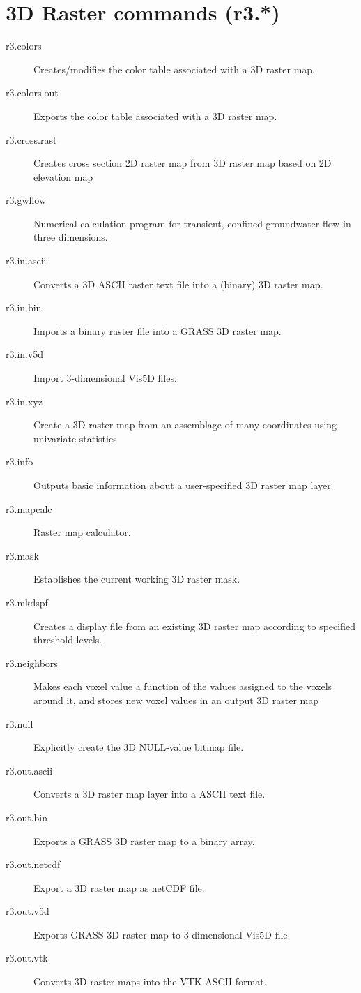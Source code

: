 
\section{3D Raster commands (r3.{*})}
\begin{description}
\item [{r3.colors}] Creates/modifies the color table associated with a
3D raster map.
\item [{r3.colors.out}] Exports the color table associated with a 3D raster
map.
\item [{r3.cross.rast}] Creates cross section 2D raster map from 3D raster
map based on 2D elevation map
\item [{r3.gwflow}] Numerical calculation program for transient, confined
groundwater flow in three dimensions.
\item [{r3.in.ascii}] Converts a 3D ASCII raster text file into a (binary)
3D raster map.
\item [{r3.in.bin}] Imports a binary raster file into a GRASS 3D raster
map.
\item [{r3.in.v5d}] Import 3-dimensional Vis5D files.
\item [{r3.in.xyz}] Create a 3D raster map from an assemblage of many coordinates
using univariate statistics
\item [{r3.info}] Outputs basic information about a user-specified 3D raster
map layer.
\item [{r3.mapcalc}] Raster map calculator.
\item [{r3.mask}] Establishes the current working 3D raster mask.
\item [{r3.mkdspf}] Creates a display file from an existing 3D raster map
according to specified threshold levels.
\item [{r3.neighbors}] Makes each voxel value a function of the values
assigned to the voxels around it, and stores new voxel values in an
output 3D raster map
\item [{r3.null}] Explicitly create the 3D NULL-value bitmap file.
\item [{r3.out.ascii}] Converts a 3D raster map layer into a ASCII text
file.
\item [{r3.out.bin}] Exports a GRASS 3D raster map to a binary array.
\item [{r3.out.netcdf}] Export a 3D raster map as netCDF file.
\item [{r3.out.v5d}] Exports GRASS 3D raster map to 3-dimensional Vis5D
file.
\item [{r3.out.vtk}] Converts 3D raster maps into the VTK-ASCII format.

\end{description}
